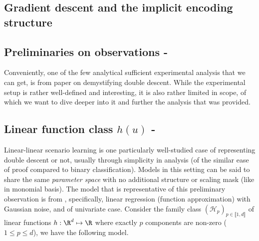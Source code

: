 \documentclass[
  journal=largetwo,
  year=2025,
  volume=37,
]{cup-journal}
\begin{document}
\subsection{Gradient descent and the implicit encoding structure}

\subsection{Preliminaries on observations - \cite{schaeffer_double_2023}}

Conveniently, one of the few analytical sufficient experimental analysis that we can get, is from \cite{schaeffer_double_2023} paper on demystifying double descent. While the experimental setup is rather well-defined and interesting, it is also rather limited in scope, of which we want to dive deeper into it and further the analysis that was provided. 

\subsection{Linear function class $h(u)$ - \cite{lafon_understanding_2024}}

Linear-linear scenario learning is one particularly well-studied case of representing double descent or not, usually through simplicity in analysis (of the similar ease of proof compared to binary classification). Models in this setting can be said to share the same \textit{parameter space} with no additional structure or scaling mask (like in monomial basis). The model that is representative of this preliminary observation is from \cite{lafon_understanding_2024}, specifically, linear regression (function approximation) with Gaussian noise, and of univariate case. Consider the family class $(\mathcal{H}_p)_{p\in\llbracket1,d\rrbracket}$ of linear functions $h:\R^d\mapsto \R$ where exactly $p$ components are non-zero ($1\leq p\leq d$), we have the following model.
\end{document}
